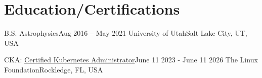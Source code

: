 \section{Education/Certifications}
\mySubHeadingListStart

  \mySubHeading
    {B.S. Astrophysics}{Aug 2016 -- May 2021}
    {University of Utah}{Salt Lake City, UT, USA}
    \hfill

  \mySubHeading
    {CKA: \href{https://www.credly.com/badges/41df09f4-c35c-4d07-9093-851e3eb401ba/public_url}{\textcolor{linkcolor}{Certified Kubernetes Administrator}}}{June 11 2023 - June 11 2026}
    {The Linux Foundation}{Rockledge, FL, USA}
    \hfill

\mySubHeadingListEnd
